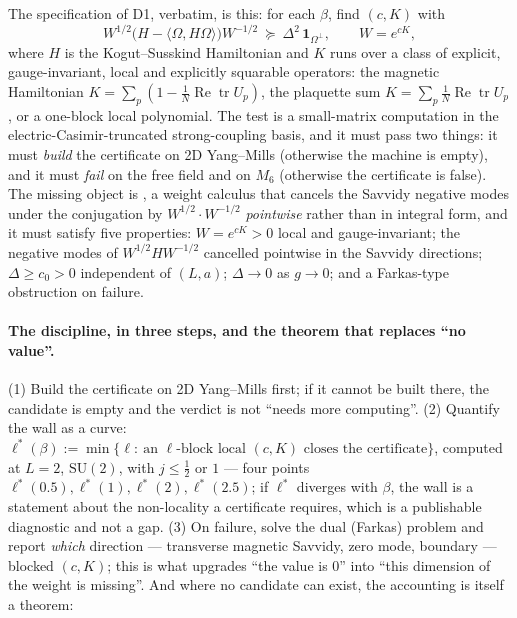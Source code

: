 The specification of D1, verbatim, is this: for each $\beta$, find $(c,K)$ with
\begin{equation}
W^{1/2}\big(H-\langle\Omega,H\Omega\rangle\big)W^{-1/2}\ \succeq\ \Delta^2\,\mathbf 1_{\Omega^\perp},
\qquad W=e^{cK},
\label{eq:ng-d1}
\end{equation}
where $H$ is the Kogut--Susskind Hamiltonian and $K$ runs over a class of explicit, gauge-invariant,
local and explicitly squarable operators: the magnetic Hamiltonian
$K=\sum_p(1-\tfrac1N\operatorname{Re}\operatorname{tr}U_p)$, the plaquette sum
$K=\sum_p\tfrac1N\operatorname{Re}\operatorname{tr}U_p$, or a one-block local polynomial. The test is a
small-matrix computation in the electric-Casimir-truncated strong-coupling basis, and it must pass two
things: it must \emph{build} the certificate on 2D Yang--Mills (otherwise the machine is empty), and it
must \emph{fail} on the free field and on $M_6$ (otherwise the certificate is false). The missing object
is , a weight calculus that cancels the Savvidy negative modes under the conjugation by
$W^{1/2}\cdot W^{-1/2}$ \emph{pointwise} rather than in integral form, and it must satisfy five
properties: $W=e^{cK}>0$ local and gauge-invariant; the negative modes of $W^{1/2}HW^{-1/2}$ cancelled
pointwise in the Savvidy directions; $\Delta\ge c_0>0$ independent of $(L,a)$; $\Delta\to0$ as $g\to0$;
and a Farkas-type obstruction on failure.

\paragraph{The discipline, in three steps, and the theorem that replaces ``no value''.}
(1) Build the certificate on 2D Yang--Mills first; if it cannot be built there, the candidate is empty
and the verdict is not ``needs more computing''. (2) Quantify the wall as a curve:
$\ell^*(\beta):=\min\{\ell:\ \text{an } \ell\text{-block local }(c,K)\text{ closes the certificate}\}$,
computed at $L=2$, $\mathrm{SU}(2)$, with $j\le\tfrac12$ or $1$ --- four points
$\ell^*(0.5),\ell^*(1),\ell^*(2),\ell^*(2.5)$; if $\ell^*$ diverges with $\beta$, the wall is a
statement about the non-locality a certificate requires, which is a publishable diagnostic and not a
gap. (3) On failure, solve the dual (Farkas) problem and report \emph{which} direction --- transverse
magnetic Savvidy, zero mode, boundary --- blocked $(c,K)$; this is what upgrades ``the value is $0$''
into ``this dimension of the weight is missing''. And where no candidate can exist, the accounting is
itself a theorem:

